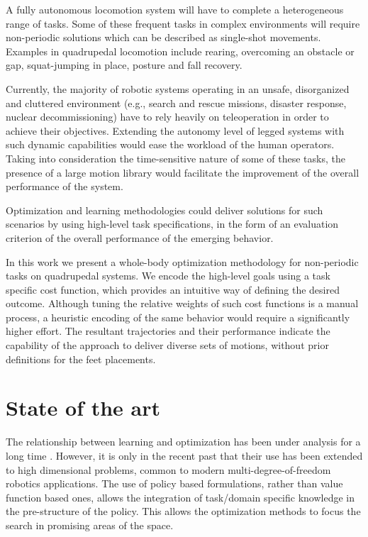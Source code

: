 \documentclass[usletter, 10pt, conference]{ieeeconf}      %
\begin{document}
A fully autonomous locomotion system will have to complete a heterogeneous range of tasks.
Some of these frequent tasks in complex environments will require non-periodic solutions which can be described as single-shot movements.
Examples in quadrupedal locomotion include rearing, overcoming an obstacle or gap, 
squat-jumping in place, posture and fall recovery. 

Currently, the majority of robotic systems operating in an unsafe, disorganized and cluttered 
environment (e.g., search and rescue missions, disaster response, nuclear decommissioning) have to rely 
heavily on teleoperation in order to achieve their objectives. Extending the autonomy level of 
legged systems with such dynamic capabilities would ease the workload of the human operators. 
Taking into consideration the time-sensitive nature of some of these tasks, the presence of a large motion library would 
facilitate the improvement of the overall performance of the system.

Optimization and learning methodologies could deliver solutions for such scenarios 
by using high-level task specifications, in the form of an evaluation criterion 
of the overall performance of the emerging behavior. 

In this work we present a whole-body optimization methodology for non-periodic tasks on quadrupedal systems.
We encode the high-level goals using a task specific cost function, which provides an intuitive way of 
defining the desired outcome. Although tuning the relative weights of such cost functions is a manual 
process, a heuristic encoding of the same behavior would require a significantly higher effort.
The resultant trajectories and their performance indicate the capability of the approach to
deliver diverse sets of motions, without prior definitions for the feet placements.

\section{State of the art}

The relationship between learning and optimization has been under analysis for a long time
\cite{bennett2006interplay,kober2013reinforcement}. However, it is only in the recent past
that their use has been extended to high dimensional problems, common to modern
multi-degree-of-freedom robotics applications. The use of policy based formulations, 
rather than value function based ones, allows the integration of task/domain specific knowledge 
in the pre-structure of the policy. This allows the optimization methods to 
focus the search in promising areas of the space.
\end{document}
